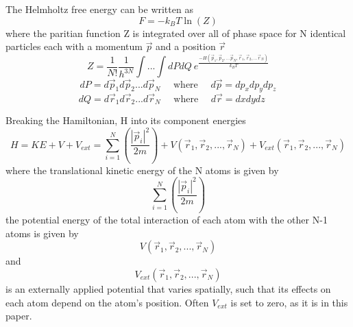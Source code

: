 \documentclass[12pt]{article}
\begin{document}


The Helmholtz free energy can be written as
\begin{equation}{F=-k_{B}T\ln(Z)}\end{equation}
where the paritian function Z is integrated over all of phase space for N identical particles each with a momentum $\vec{p}$ and a position $\vec{r}$
\begin{equation}{Z=}\frac{1}{N!}\frac{1}{h^{3N}}\int{...}\int{dPdQ}~e^\frac{-H(\vec{p}_1,\vec{p}_2,...\vec{p}_N,\vec{r}_1, \vec{r}_2,...\vec{r}_N)}{k_BT}\end{equation}
\begin{displaymath}{dP=d\vec{p}_1d\vec{p}_2...d\vec{p}_N \mbox{~~~~where~~~~} d\vec{p}=dp_xdp_ydp_z}\end{displaymath}
\begin{displaymath}{dQ=d\vec{r}_1d\vec{r}_2...d\vec{r}_N \mbox{~~~~where~~~~} d\vec{r}=dxdydz\mbox{~~~~}}\end{displaymath}

Breaking the Hamiltonian, H into its component energies
\begin{equation}{H = KE + V + V_{ext} = \sum_{i=1}^N\left(\frac{|\vec{p}_i|^2}{2m}\right)+V(\vec{r}_1,\vec{r}_2,{...},\vec{r}_N)+V_{ext}(\vec{r}_1,\vec{r}_2,{...},\vec{r}_N)}\end{equation}
where the translational kinetic energy of the N atoms is given by \begin{displaymath}{\sum_{i=1}^N\left(\frac{|\vec{p}_i|^2}{2m}\right)}\end{displaymath}
the potential energy of the total interaction of each atom with the other N-1 atoms is given by
\begin{displaymath}{V(\vec{r}_1,\vec{r}_2,{...},\vec{r}_N)}\end{displaymath} and \begin{displaymath}{V_{ext}(\vec{r}_1,\vec{r}_2,{...},\vec{r}_N)}\end{displaymath} is an externally applied potential that varies spatially, such that its effects on each atom depend on the atom's position. Often $V_{ext}$ is set to zero, as it is in this paper. 
\end{document}

